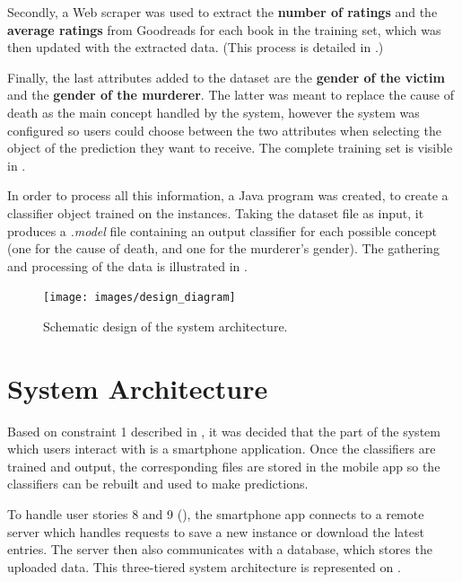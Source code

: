\documentclass{mproj}
\begin{document}
Secondly, a Web scraper was used to extract the \textbf{number of ratings} and the \textbf{average ratings} from Goodreads \cite{goodreads} for each book in the training set, which was then updated with the extracted data. (This process is detailed in .)\par

Finally, the last attributes added to the dataset are the \textbf{gender of the victim} and the \textbf{gender of the murderer}. The latter was meant to replace the cause of death as the main concept handled by the system, however the system was configured so users could choose between the two attributes when selecting the object of the prediction they want to receive. The complete training set is visible in .\par

In order to process all this information, a Java program was created, to create a classifier object trained on the instances. Taking the dataset file as input, it produces a \textit{.model} file containing an output classifier for each possible concept (one for the cause of death, and one for the murderer's gender). The gathering and processing of the data is illustrated in .

\begin{figure}[h]
	\centering
	\texttt{[image: images/design\_diagram]}
	\caption{Schematic design of the system architecture.}
	\label{fig:design}
\end{figure}

\section{System Architecture}

Based on constraint 1 described in , it was decided that the part of the system which users interact with is a smartphone application. Once the classifiers are trained and output, the corresponding files are stored in the mobile app so the classifiers can be rebuilt and used to make predictions.\par

To handle user stories 8 and 9 (), the smartphone app connects to a remote server which handles requests to save a new instance or download the latest entries. The server then also communicates with a database, which stores the uploaded data. This three-tiered system architecture is represented on .
\end{document}
